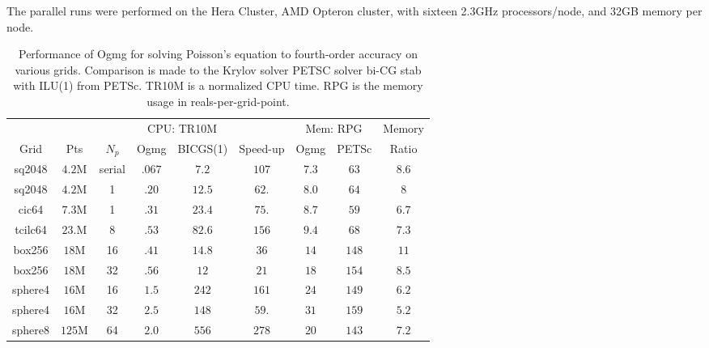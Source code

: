 The parallel runs were performed on the Hera Cluster, AMD Opteron cluster, with sixteen 2.3GHz processors/node, 
and 32GB memory per node.


\begin{table}[hbt]
\begin{center}
\begin{tabular}{|c|c|c||c|c|c||c|c|c|} \hline 
      & & & \multicolumn{2}{|c|}{CPU: TR10M} &   & \multicolumn{2}{|c|}{Mem: RPG} &   Memory  \\
   Grid          &  Pts     &  $N_p$   &  Ogmg     &  BICGS(1)  & Speed-up       &   Ogmg   &  PETSc       &  Ratio \\ \hline
 sq2048          & $4.2$M   & serial   &  $.067$   & $7.2$      & $107$          & $7.3$    & $ 63 $       & $8.6$ \\ 
 sq2048          & $4.2$M   &      1   &  $.20$    & $12.5$     & $62.$          & $8.0$    & $ 64 $       & $ 8 $ \\ 
 cic64           & $7.3$M   &      1   &  $.31$    & $23.4$     & $75.$          & $8.7$    & $ 59 $       & $6.7$ \\ 
 tcilc64         & $23.$M   &      8   &  $.53$    & $82.6$     & $156$          & $9.4$    & $ 68 $       & $7.3$ \\ 
\hline %
 box256          & $18$M    &     16   &  $.41$    & $14.8$     & $36 $          & $14 $    & $148 $       & $11$ \\ 
 box256          & $18$M    &     32   &  $.56$    & $12 $      & $21 $          & $18 $    & $154 $       & $8.5$ \\ 
 sphere4         & $16$M    &     16   &  $1.5$    & $242$      & $161$          & $24 $    & $149 $       & $6.2$ \\ 
 sphere4         & $16$M    &     32   &  $2.5$    & $148$      & $59.$          & $31 $    & $159 $       & $5.2$ \\ 
 sphere8         & $125$M   &     64   &  $2.0$    & $556$      & $278$          & $20 $    & $143 $       & $7.2$ \\ 
\hline 
\end{tabular}
\end{center}
\caption{Performance of Ogmg for solving Poisson's equation to fourth-order accuracy on various grids. Comparison is made to 
the Krylov solver PETSC solver bi-CG stab with ILU(1) from PETSc.
TR10M is a normalized CPU time. RPG is the memory usage in reals-per-grid-point.
}
\label{tab:performanceSecondOrder} 
\end{table}

